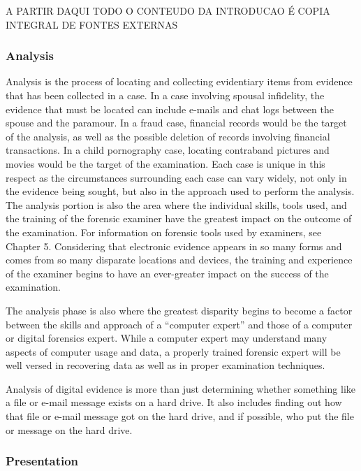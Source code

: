 \begin{center}
A PARTIR DAQUI TODO O CONTEUDO DA INTRODUCAO É COPIA INTEGRAL DE FONTES EXTERNAS
\end{center}

\subsubsection{Analysis}

Analysis is the process of locating and collecting evidentiary items from evidence
that has been collected in a case. In a case involving spousal infidelity, the evidence
that must be located can include e-mails and chat logs between the spouse and the
paramour. In a fraud case, financial records would be the target of the analysis, as
well as the possible deletion of records involving financial transactions. In a child
pornography case, locating contraband pictures and movies would be the target of
the examination. Each case is unique in this respect as the circumstances surrounding
each case can vary widely, not only in the evidence being sought, but also in the
approach used to perform the analysis. The analysis portion is also the area where
the individual skills, tools used, and the training of the forensic examiner have
the greatest impact on the outcome of the examination. For information on forensic
tools used by examiners, see Chapter 5. Considering that electronic evidence
appears in so many forms and comes from so many disparate locations and devices,
the training and experience of the examiner begins to have an ever-greater impact
on the success of the examination.

The analysis phase is also where the greatest disparity begins to become a factor
between the skills and approach of a “computer expert” and those of a computer or
digital forensics expert. While a computer expert may understand many aspects of
computer usage and data, a properly trained forensic expert will be well versed in
recovering data as well as in proper examination techniques.

Analysis of digital evidence is more than just determining whether something
like a file or e-mail message exists on a hard drive. It also includes finding out how
that file or e-mail message got on the hard drive, and if possible, who put the file or
message on the hard drive.

\subsubsection{Presentation}

